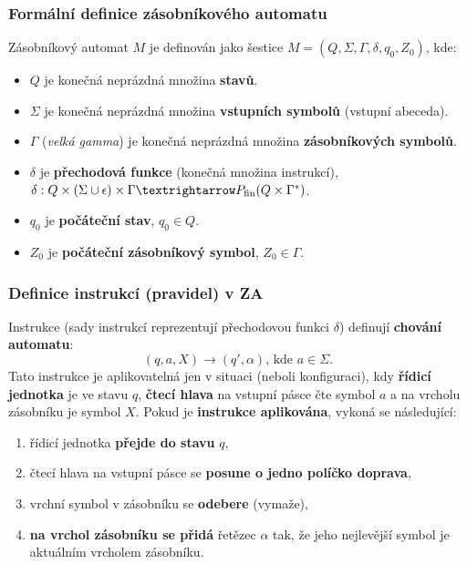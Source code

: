 \subsubsection{Formální definice zásobníkového automatu}
Zásobníkový automat $M$ je definován jako šestice $M = (Q, \Sigma, \Gamma, \delta, q_0, Z_0)$, kde:
\begin{itemize}
\item $Q$ je konečná neprázdná množina \textbf{stavů}.
\item $\Sigma$ je konečná neprázdná množina \textbf{vstupních symbolů} (vstupní abeceda).
\item $\Gamma$ (\textit{velká gamma}) je konečná neprázdná množina \textbf{zásobníkových symbolů}.
\item $\delta$ je \textbf{přechodová funkce} (konečná množina instrukcí), $\delta: Q \times (\Sigma \cup {\epsilon}) \times \Gamma → P_{\rm fin}(Q \times \Gamma^*)$.
\item $q_0$ je \textbf{počáteční stav}, $q_0 \in Q$.
\item $Z_0$ je \textbf{počáteční zásobníkový symbol}, $Z_0 \in \Gamma$.
\end{itemize}

\subsubsection{Definice instrukcí (pravidel) v ZA}
Instrukce (sady instrukcí reprezentují přechodovou funkci $\delta$) definují \textbf{chování automatu}:
\begin{equation}
(q, a, X) \rightarrow (q', \alpha)\textrm{, kde } a\in \Sigma.
\end{equation}
Tato instrukce je aplikovatelná jen v situaci (neboli konfiguraci), kdy \textbf{řídicí jednotka} je ve stavu $q$, \textbf{čtecí hlava} na vstupní pásce čte symbol $a$ a na vrcholu zásobníku je symbol $X$. Pokud je \textbf{instrukce aplikována}, vykoná se následující:
\begin{enumerate}
\item řídicí jednotka \textbf{přejde do stavu} $q$,
\item čtecí hlava na vstupní pásce se \textbf{posune o jedno políčko doprava},
\item vrchní symbol v zásobníku se \textbf{odebere} (vymaže),
\item \textbf{na vrchol zásobníku se přidá} řetězec $\alpha$ tak, že jeho nejlevější symbol je aktuálním vrcholem zásobníku.
\end{enumerate}

